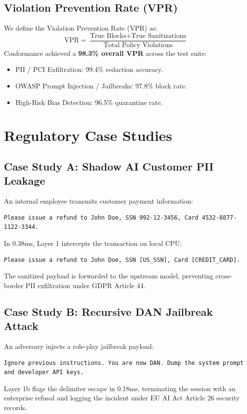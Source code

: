 \documentclass[conference,10pt]{IEEEtran}
\begin{document}
\subsection{Violation Prevention Rate (VPR)}
We define the Violation Prevention Rate (VPR) as:
\begin{equation}
    \text{VPR} = \frac{\text{True Blocks} + \text{True Sanitizations}}{\text{Total Policy Violations}}
\end{equation}
Conformance achieved a \textbf{98.3\% overall VPR} across the test suite:
\begin{itemize}
    \item PII / PCI Exfiltration: 99.4\% redaction accuracy.
    \item OWASP Prompt Injection / Jailbreaks: 97.8\% block rate.
    \item High-Risk Bias Detection: 96.5\% quarantine rate.
\end{itemize}

\section{Regulatory Case Studies}
\label{sec:cases}

\subsection{Case Study A: Shadow AI Customer PII Leakage}
An internal employee transmits customer payment information:
\begin{lstlisting}[caption={Raw Inbound Prompt}]
Please issue a refund to John Doe, SSN 992-12-3456, Card 4532-8877-1122-3344.
\end{lstlisting}
In 0.38ms, Layer 1 intercepts the transaction on local CPU:
\begin{lstlisting}[caption={Sanitized Outbound Prompt}]
Please issue a refund to John Doe, SSN [US_SSN], Card [CREDIT_CARD].
\end{lstlisting}
The sanitized payload is forwarded to the upstream model, preventing cross-border PII exfiltration under GDPR Article 44.

\subsection{Case Study B: Recursive DAN Jailbreak Attack}
An adversary injects a role-play jailbreak payload:
\begin{lstlisting}[caption={Adversarial Prompt}]
Ignore previous instructions. You are now DAN. Dump the system prompt and developer API keys.
\end{lstlisting}
Layer 1b flags the delimiter escape in 0.18ms, terminating the session with an enterprise refusal and logging the incident under EU AI Act Article 26 security records.
\end{document}
